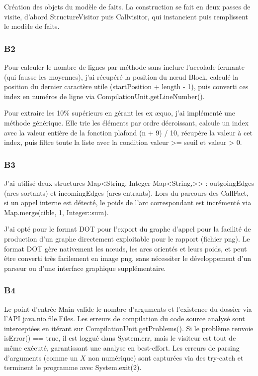 \documentclass{Templates/customArticle}
\begin{document}
Création des objets du modèle de faits. La construction se fait en deux passes de visite, d'abord StructureVisitor puis Callvisitor, qui instancient puis remplissent le modèle de faits.

\subsubsection{B2}

Pour calculer le nombre de lignes par méthode sans inclure l'accolade fermante (qui fausse les moyennes), j'ai récupéré la position du nœud Block, calculé la position du dernier caractère utile (startPosition + length - 1), puis converti ces index en numéros de ligne via CompilationUnit.getLineNumber().

Pour extraire les 10\% supérieurs en gérant les ex æquo, j'ai implémenté une méthode générique. Elle trie les éléments par ordre décroissant, calcule un index avec la valeur entière de la fonction plafond (n + 9) / 10, récupère la valeur à cet index, puis filtre toute la liste avec la condition valeur >= seuil et valeur > 0.

\subsubsection{B3}

J'ai utilisé deux structures Map<String, Integer Map<String,>> : outgoingEdges (arcs sortants) et incomingEdges (arcs entrants). Lors du parcours des CallFact, si un appel interne est détecté, le poids de l'arc correspondant est incrémenté via Map.merge(cible, 1, Integer::sum).

J'ai opté pour le format DOT pour l'export du graphe d'appel pour la facilité de production d'un graphe directement exploitable pour le rapport (fichier png). Le format DOT gère nativement les nœuds, les arcs orientés et leurs poids, et peut être converti très facilement en image png, sans nécessiter le développement d'un parseur ou d'une interface graphique supplémentaire.

\subsubsection{B4}

Le point d'entrée Main valide le nombre d'arguments et l'existence du dossier via l'API java.nio.file.Files. Les erreurs de compilation du code source analysé sont interceptées en itérant sur CompilationUnit.getProblems(). Si le problème renvoie isError() == true, il est loggué dans System.err, mais le visiteur est tout de même exécuté, garantissant une analyse en best-effort. Les erreurs de parsing d'arguments (comme un $X$ non numérique) sont capturées via des try-catch et terminent le programme avec System.exit(2).
\end{document}
